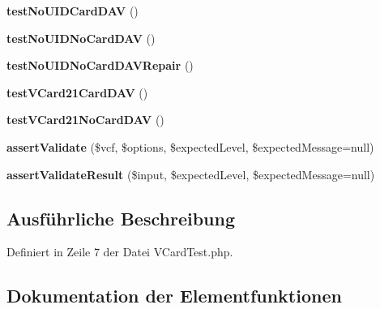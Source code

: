\begin{DoxyCompactItemize}
{\bfseries test\+No\+U\+I\+D\+Card\+D\+AV} ()
\item 
\mbox{\label{class_sabre_1_1_v_object_1_1_component_1_1_v_card_test_ac2f3eb7ebb63357e4599ec6574e27947}} 
{\bfseries test\+No\+U\+I\+D\+No\+Card\+D\+AV} ()
\item 
\mbox{\label{class_sabre_1_1_v_object_1_1_component_1_1_v_card_test_a30db63b780b12fe0051c4127a742ab2f}} 
{\bfseries test\+No\+U\+I\+D\+No\+Card\+D\+A\+V\+Repair} ()
\item 
\mbox{\label{class_sabre_1_1_v_object_1_1_component_1_1_v_card_test_adb5ebbbb420a5cee8be495a6653d1ace}} 
{\bfseries test\+V\+Card21\+Card\+D\+AV} ()
\item 
\mbox{\label{class_sabre_1_1_v_object_1_1_component_1_1_v_card_test_aca6bc7bc2dfa8e606c58aeefa39d0220}} 
{\bfseries test\+V\+Card21\+No\+Card\+D\+AV} ()
\item 
\mbox{\label{class_sabre_1_1_v_object_1_1_component_1_1_v_card_test_ab6937422e709a7dca5b3c3cd9989920b}} 
{\bfseries assert\+Validate} (\$vcf, \$options, \$expected\+Level, \$expected\+Message=null)
\item 
\mbox{\label{class_sabre_1_1_v_object_1_1_component_1_1_v_card_test_adc7fb0b5c70979f72f8c4a56802db0e0}} 
{\bfseries assert\+Validate\+Result} (\$input, \$expected\+Level, \$expected\+Message=null)
\end{DoxyCompactItemize}


\subsection{Ausführliche Beschreibung}


Definiert in Zeile 7 der Datei V\+Card\+Test.\+php.



\subsection{Dokumentation der Elementfunktionen}
\mbox{\label{class_sabre_1_1_v_object_1_1_component_1_1_v_card_test_afc6bb532c01bc77986c115a8d58cd2fe}} 

